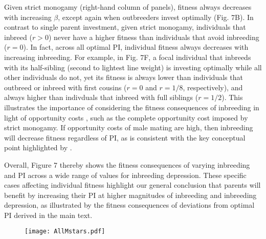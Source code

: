 \documentclass[12pt]{article}
\begin{document}
Given strict monogamy (right-hand column of panels), fitness always decreases with increasing $\beta$, except again when outbreeders invest optimally (Fig. 7B). In contrast to single parent investment, given strict monogamy, individuals that inbreed ($r>0$) never have a higher fitness than individuals that avoid inbreeding ($r=0$). In fact, across all optimal PI, individual fitness always decreases with increasing inbreeding. For example, in Fig. 7F, a focal individual that inbreeds with its half-sibling (second to lightest line weight) is investing optimally while all other individuals do not, yet its fitness is always lower than individuals that outbreed or inbreed with first cousins ($r=0$ and $r=1/8$, respectively), and always higher than indivduals that inbreed with full siblings ($r=1/2$). This illustrates the importance of considering the fitness consequences of inbreeding in light of opportunity costs \cite[][]{Waser1986}, such as the complete opportunity cost imposed by strict monogamy. If opportunity costs of male mating are high, then inbreeding will decrease fitness regardless of PI, as is consistent with the key conceptual point highlighted by \cite{Waser1986}.

Overall, Figure 7 thereby shows the fitness consequences of varying inbreeding and PI across a wide range of values for inbreeding depression. These specific cases affecting individual fitness highlight our general conclusion that parents will benefit by increasing their PI at higher magnitudes of inbreeding and inbreeding depression, as illustrated by the fitness consequences of deviations from optimal PI derived in the main text.

\clearpage

\begin{figure}[H]
\begin{center}				
\texttt{[image: AllMstars.pdf]}
\end{center}
\label{AllMstars}
\end{figure}

\clearpage



\end{document}
